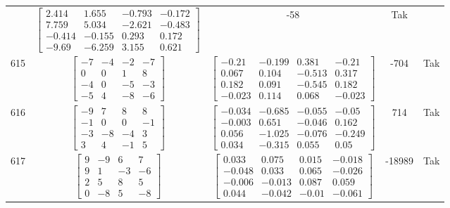 \documentclass[a4paper,12pt]{article}
\begin{document}
\begin{tabular}{c c c c c}
&
$\begin{bmatrix} 2.414 & 1.655 & -0.793 & -0.172 \\ 7.759 & 5.034 & -2.621 & -0.483 \\ -0.414 & -0.155 & 0.293 & 0.172 \\ -9.69 & -6.259 & 3.155 & 0.621 \end{bmatrix}$
&
-58
&
Tak
\\
615
&
$\begin{bmatrix} -7 & -4 & -2 & -7 \\ 0 & 0 & 1 & 8 \\ -4 & 0 & -5 & -3 \\ -5 & 4 & -8 & -6 \end{bmatrix}$
&
$\begin{bmatrix} -0.21 & -0.199 & 0.381 & -0.21 \\ 0.067 & 0.104 & -0.513 & 0.317 \\ 0.182 & 0.091 & -0.545 & 0.182 \\ -0.023 & 0.114 & 0.068 & -0.023 \end{bmatrix}$
&
-704
&
Tak
\\
616
&
$\begin{bmatrix} -9 & 7 & 8 & 8 \\ -1 & 0 & 0 & -1 \\ -3 & -8 & -4 & 3 \\ 3 & 4 & -1 & 5 \end{bmatrix}$
&
$\begin{bmatrix} -0.034 & -0.685 & -0.055 & -0.05 \\ -0.003 & 0.651 & -0.046 & 0.162 \\ 0.056 & -1.025 & -0.076 & -0.249 \\ 0.034 & -0.315 & 0.055 & 0.05 \end{bmatrix}$
&
714
&
Tak
\\
617
&
$\begin{bmatrix} 9 & -9 & 6 & 7 \\ 9 & 1 & -3 & -6 \\ 2 & 5 & 8 & 5 \\ 0 & -8 & 5 & -8 \end{bmatrix}$
&
$\begin{bmatrix} 0.033 & 0.075 & 0.015 & -0.018 \\ -0.048 & 0.033 & 0.065 & -0.026 \\ -0.006 & -0.013 & 0.087 & 0.059 \\ 0.044 & -0.042 & -0.01 & -0.061 \end{bmatrix}$
&
-18989
&
Tak
\\

\end{tabular}
\end{document}
